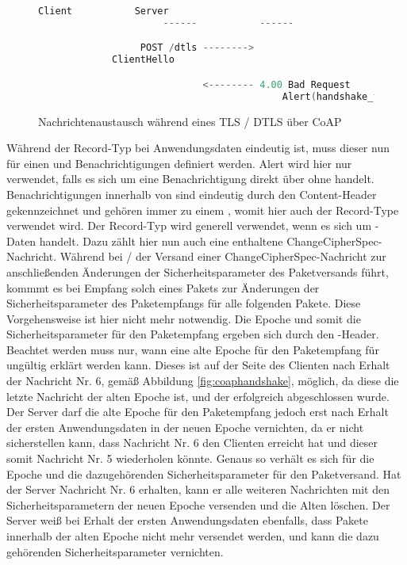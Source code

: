 \begin{figure}[ht]
  \centering
  \begin{lstlisting}[language=c]
                      Client           Server
                      ------           ------

                  POST /dtls -------->
             ClientHello

                             <-------- 4.00 Bad Request
                                           Alert(handshake_failure)
  \end{lstlisting}
  \caption{Nachrichtenaustausch während eines TLS / DTLS  über CoAP}
  \label{fig:coaphandshakefail}
\end{figure}

Während der Record-Typ bei Anwendungsdaten eindeutig ist, muss dieser nun für einen  und Benachrichtigungen definiert werden.
Alert wird hier nur verwendet, falls es sich um eine Benachrichtigung direkt über  ohne  handelt.
Benachrichtigungen innerhalb von  sind eindeutig durch den Content-Header gekennzeichnet und gehören immer zu einem ,
womit hier auch der Record-Type  verwendet wird. Der Record-Typ  wird generell verwendet, wenn es sich um -Daten handelt.
Dazu zählt hier nun auch eine enthaltene ChangeCipherSpec-Nachricht. Während bei / der Versand einer ChangeCipherSpec-Nachricht
zur anschließenden Änderungen der Sicherheitsparameter des Paketversands führt, kommmt es bei Empfang solch eines Pakets zur Änderungen der
Sicherheitsparameter des Paketempfangs für alle folgenden Pakete. Diese Vorgehensweise ist hier nicht mehr notwendig. Die Epoche und somit
die Sicherheitsparameter für den Paketempfang ergeben sich durch den -Header. Beachtet werden muss nur, wann eine alte Epoche
für den Paketempfang für ungültig erklärt werden kann. Dieses ist auf der Seite des Clienten nach Erhalt der Nachricht Nr. 6, gemäß Abbildung
\ref{fig:coaphandshake}, möglich, da diese die letzte Nachricht der alten Epoche ist, und der  erfolgreich abgeschlossen wurde.
Der Server darf die alte Epoche für den Paketempfang jedoch erst nach Erhalt der ersten Anwendungsdaten in der neuen Epoche vernichten, da
er nicht sicherstellen kann, dass Nachricht Nr. 6 den Clienten erreicht hat und dieser somit Nachricht Nr. 5 wiederholen könnte.
Genaus so verhält es sich für die Epoche und die dazugehörenden Sicherheitsparameter für den Paketversand. Hat der Server Nachricht Nr. 6
erhalten, kann er alle weiteren Nachrichten mit den Sicherheitsparametern der neuen Epoche versenden und die Alten löschen. Der Server
weiß bei Erhalt der ersten Anwendungsdaten ebenfalls, dass Pakete innerhalb der alten Epoche nicht mehr versendet werden, und kann die
dazu gehörenden Sicherheitsparameter vernichten.

